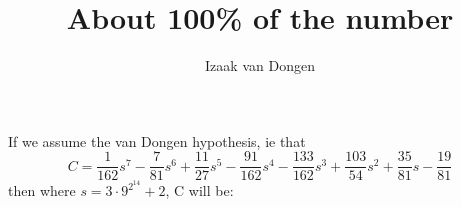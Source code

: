\documentclass[fleqn,a4paper,11pt]{article}
\title{About 100\% of the number}
\author{Izaak van Dongen}
\begin{document}
\maketitle\thispagestyle{empty} %

If we assume the van Dongen hypothesis, ie that
\begin{equation*}
C = \frac{1}{162}s^7 - \frac{7}{81}s^6 + \frac{11}{27}s^5 - \frac{91}{162}s^4
    - \frac{133}{162}s^3 + \frac{103}{54}s^2 + \frac{35}{81}s - \frac{19}{81}
\end{equation*}
then where \(s = 3 \cdot 9^{2^{14}} + 2\), C will be:


\end{document}
